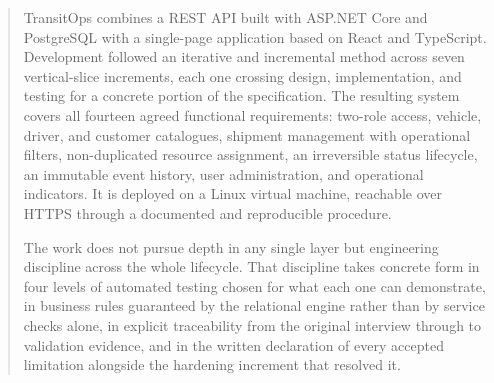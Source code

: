 \begin{abstract}
\begin{segundoresumo}
    TransitOps combines a REST API built with ASP.NET Core and PostgreSQL with a single-page application based on React and TypeScript. Development followed an iterative and incremental method across seven vertical-slice increments, each one crossing design, implementation, and testing for a concrete portion of the specification. The resulting system covers all fourteen agreed functional requirements: two-role access, vehicle, driver, and customer catalogues, shipment management with operational filters, non-duplicated resource assignment, an irreversible status lifecycle, an immutable event history, user administration, and operational indicators. It is deployed on a Linux virtual machine, reachable over HTTPS through a documented and reproducible procedure.

    The work does not pursue depth in any single layer but engineering discipline across the whole lifecycle. That discipline takes concrete form in four levels of automated testing chosen for what each one can demonstrate, in business rules guaranteed by the relational engine rather than by service checks alone, in explicit traceability from the original interview through to validation evidence, and in the written declaration of every accepted limitation alongside the hardening increment that resolved it.
  \end{segundoresumo}
  \vspace*{25pt}
  
\end{abstract}
\pagestyle{fancy}
